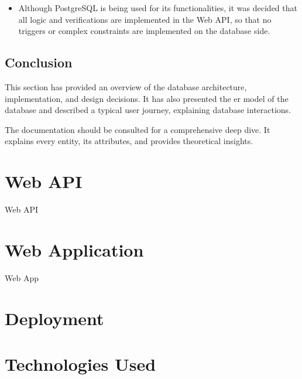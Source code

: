 \begin{itemize}
    \item Although PostgreSQL is being used for its functionalities, it was decided that all logic and verifications are implemented in the Web API, so that no triggers or complex constraints are implemented on the database side.
\end{itemize}

\subsection{Conclusion}
This section has provided an overview of the database architecture, implementation, and design decisions. It has also presented the \acs{er model} of the database and described a typical user journey, explaining database interactions.

The documentation should be consulted for a comprehensive deep dive. It explains every entity, its attributes, and provides theoretical insights.

\section{Web API}
Web API

\section{Web Application}
Web App

\section{Deployment}

\section{Technologies Used}


